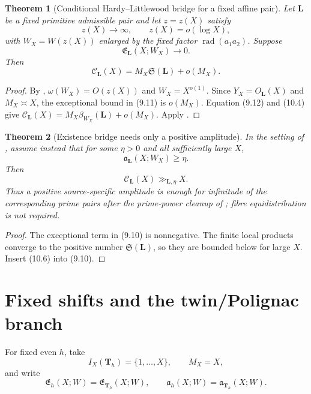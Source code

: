 \documentclass[11pt]{article}
\newtheorem{theorem}{Theorem}[section]
\theoremstyle{definition}
\theoremstyle{remark}
\newcommand{\rad}{\operatorname{rad}}
\begin{document}
\begin{theorem}[Conditional Hardy--Littlewood bridge for a fixed affine pair]
\label{thm:fixed-HL-bridge}
Let $\bm L$ be a fixed primitive admissible pair and let $z=z(X)$ satisfy
\[
 z(X)\to\infty,
 \qquad z(X)=o(\log X),
 \tag{10.3}
\]
with $W_X=W(z(X))$ enlarged by the fixed factor $\rad(a_1a_2)$.  Suppose
\[
 \boxed{\mathfrak E_{\bm L}(X;W_X)\longrightarrow0.}
 \tag{10.4}
\]
Then
\[
 \boxed{
 \mathcal C_{\bm L}(X)
 =M_X\mathfrak S(\bm L)+o(M_X).}
 \tag{10.5}
\]
\end{theorem}

\begin{proof}
By , $\omega(W_X)=O(z(X))$ and
$W_X=X^{o(1)}$.  Since $Y_X=O_{\bm L}(X)$ and $M_X\asymp X$, the exceptional
bound in \textup{(9.11)} is $o(M_X)$.  Equation \textup{(9.12)} and
\textup{(10.4)} give
$\mathcal C_{\bm L}(X)=M_X\beta_{W_X}(\bm L)+o(M_X)$.  Apply
.
\end{proof}

\begin{theorem}[Existence bridge needs only a positive amplitude]
\label{thm:fixed-lower-bridge}
In the setting of , assume instead that for some
$\eta>0$ and all sufficiently large $X$,
\[
 \boxed{\mathfrak a_{\bm L}(X;W_X)\ge\eta.}
 \tag{10.6}
\]
Then
\[
 \mathcal C_{\bm L}(X)\gg_{\bm L,\eta}X.
 \tag{10.7}
\]
Thus a positive source-specific amplitude is enough for infinitude of the
corresponding prime pairs after the prime-power cleanup of
; fibre equidistribution is not required.
\end{theorem}

\begin{proof}
The exceptional term in \textup{(9.10)} is nonnegative.  The finite local
products converge to the positive number $\mathfrak S(\bm L)$, so they are
bounded below for large $X$.  Insert \textup{(10.6)} into \textup{(9.10)}.
\end{proof}

\section{Fixed shifts and the twin/Polignac branch}
\label{sec:fixed-shift}

For fixed even $h$, take
\[
 I_X(\bm T_h)=\{1,\ldots,X\},
 \qquad M_X=X,
 \tag{11.1}
\]
and write
\[
 \mathfrak E_h(X;W)=\mathfrak E_{\bm T_h}(X;W),
 \qquad
 \mathfrak a_h(X;W)=\mathfrak a_{\bm T_h}(X;W).
 \tag{11.2}
\]
\end{document}
